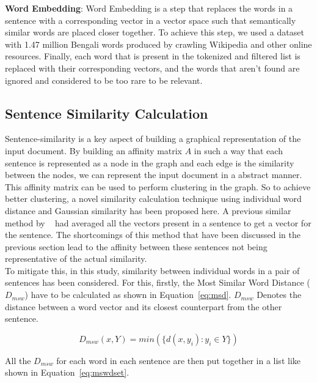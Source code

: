 \textbf{Word Embedding}: Word Embedding is a step that replaces the words
in a sentence with a corresponding vector in a vector space such that semantically similar words
are placed closer together.
To achieve this step,
we used a dataset with 1.47 million Bengali words produced by \citeauthor{grave-etal-2018-fasttext}
\cite{grave-etal-2018-fasttext}crawling Wikipedia and other online resources.
Finally, each word that is present in the tokenized and filtered list is replaced with their
corresponding vectors, and the words that aren't found are ignored and considered to be too rare to be relevant.

\subsection{Sentence Similarity Calculation}\label{subsec:sentence-similarity-calculation}
Sentence-similarity is a key aspect of building a graphical representation
of the input document.
By building an affinity matrix $A$ in such a way that each sentence is represented
as a node in the graph and each edge is the similarity between the nodes,
we can represent the input document in a abstract manner.
This affinity matrix can be used to perform clustering in the graph.
So to achieve better clustering, a novel similarity calculation technique
using individual word distance and Gaussian similarity has been proposed here.
A previous similar method by \citeauthor{roychowdhury-etal-2022-spectral-base}~\cite{roychowdhury-etal-2022-spectral-base}
had averaged all the vectors present in a sentence to get a vector for the sentence.
The shortcomings of this method that have been discussed in the previous section
lead to the affinity between these sentences not being representative of the actual similarity.\\

To mitigate this, in this study, similarity between individual words in a pair of sentences has been considered.
For this, firstly, the Most Similar Word Distance ($D_{msw}$) have to be calculated as shown in Equation~\ref{eq:msd}.
$D_{msw}$ Denotes the distance between a word vector and its closest counterpart from the other sentence.

\begin{equation}\label{eq:msd}
    D_{msw}(x,Y) = min(\{d(x,y_i) : y_i \in Y \})
\end{equation}

All the $D_{msw}$ for each word in each sentence are then put together in a list like shown in
Equation~\ref{eq:mswdset}.

